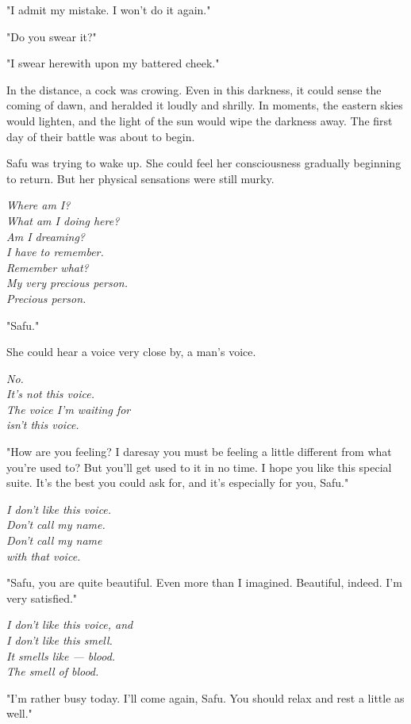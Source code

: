 "I admit my mistake. I won't do it again."

"Do you swear it?"

"I swear herewith upon my battered cheek."

In the distance, a cock was crowing. Even in this darkness, it could
sense the coming of dawn, and heralded it loudly and shrilly. In
moments, the eastern skies would lighten, and the light of the sun would
wipe the darkness away. The first day of their battle was about to
begin.

\mybreak

Safu was trying to wake up. She could feel her consciousness gradually
beginning to return. But her physical sensations were still murky.

\emph{Where am I?\\
	What am I doing here?\\
	Am I dreaming?\\
	I have to remember.\\
	Remember what?\\
	My very precious person.\\
	Precious person.}

"Safu."

She could hear a voice very close by, a man's voice.

\emph{No.\\
	It's not this voice.\\
	The voice I'm waiting for\\
	isn't this voice.}

"How are you feeling? I daresay you must be feeling a little different
from what you're used to? But you'll get used to it in no time. I hope
you like this special suite. It's the best you could ask for, and it's
especially for you, Safu."

\emph{I don't like this voice.\\
	Don't call my name.\\
	Don't call my name\\
	with that voice.}

"Safu, you are quite beautiful. Even more than I imagined. Beautiful,
indeed. I'm very satisfied."

\emph{I don't like this voice, and\\
	I don't like this smell.\\
	It smells like --- blood.\\
	The smell of blood.}

"I'm rather busy today. I'll come again, Safu. You should relax and rest
a little as well."

